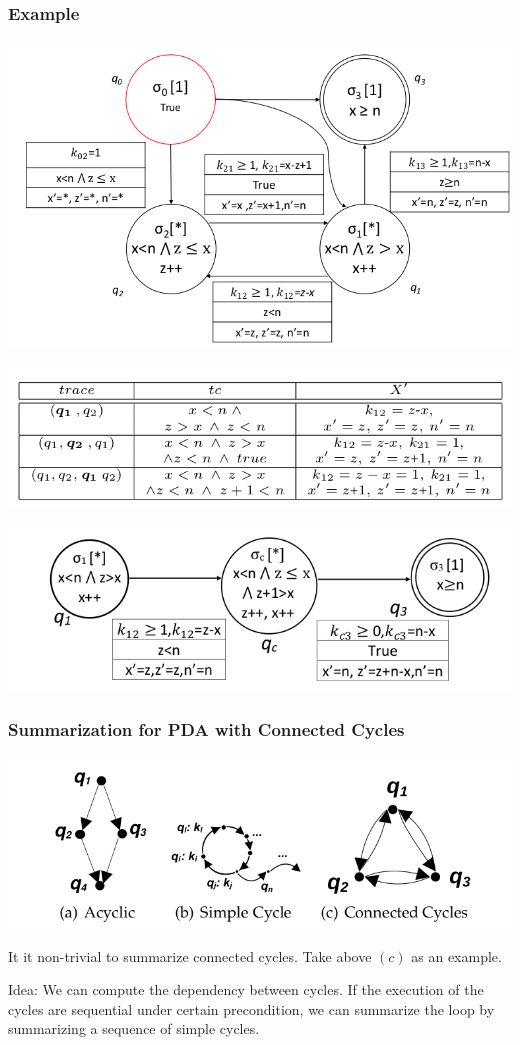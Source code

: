 \documentclass[11pt]{beamer}
\begin{document}
\begin{frame}\frametitle{Example}
\begin{center}
\includegraphics[scale=0.2]{loopdetail.png}

\includegraphics[scale=0.35]{tracetable.png}

\includegraphics[scale=0.3]{merged.png}
\end{center}
\end{frame}

\begin{frame}\frametitle{Summarization for PDA with Connected Cycles}
\begin{center}

\includegraphics[scale=0.3]{pdaloops.png}
\end{center}

It it non-trivial to summarize connected cycles. Take above $(c)$ as an example.

Idea: We can compute the dependency between cycles. If the execution of the cycles are sequential under certain precondition, we can summarize the loop by summarizing a sequence of simple cycles.
\end{frame}
\end{document}
